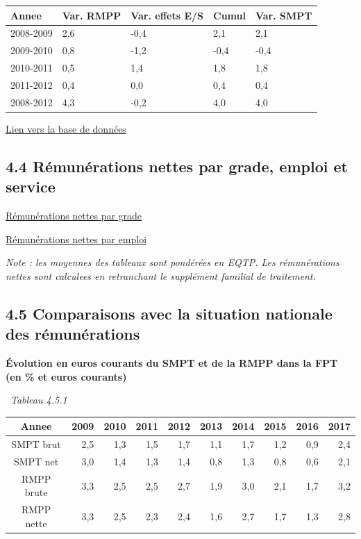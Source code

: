 \begin{longtable}[]{@{}lllll@{}}
\toprule
Annee & Var. RMPP & Var. effets E/S & Cumul & Var. SMPT\tabularnewline
\midrule
\endhead
2008-2009 & 2,6 & -0,4 & 2,1 & 2,1\tabularnewline
2009-2010 & 0,8 & -1,2 & -0,4 & -0,4\tabularnewline
2010-2011 & 0,5 & 1,4 & 1,8 & 1,8\tabularnewline
2011-2012 & 0,4 & 0,0 & 0,4 & 0,4\tabularnewline
2008-2012 & 4,3 & -0,2 & 4,0 & 4,0\tabularnewline
\bottomrule
\end{longtable}

\href{../Bases/Remunerations/Anavar.synthese.csv}{Lien vers la base de
données}

\hypertarget{remunerations-nettes-par-grade-emploi-et-service}{%
\subsection{4.4 Rémunérations nettes par grade, emploi et
service}\label{remunerations-nettes-par-grade-emploi-et-service}}

\href{../Bases/Remunerations/net.grades.csv}{Rémunérations nettes par
grade}

\href{../Bases/Remunerations/net.emplois.csv}{Rémunérations nettes par
emploi}

\emph{Note : les moyennes des tableaux sont pondérées en EQTP. Les
rémunérations nettes sont calculees en retranchant le supplément
familial de traitement.}

\hypertarget{comparaisons-avec-la-situation-nationale-des-remunerations}{%
\subsection{4.5 Comparaisons avec la situation nationale des
rémunérations}\label{comparaisons-avec-la-situation-nationale-des-remunerations}}

\textbf{Évolution en euros courants du SMPT et de la RMPP dans la FPT
(en \% et euros courants)}

~\emph{Tableau 4.5.1}

\begin{longtable}[]{@{}crrrrrrrrr@{}}
\toprule
Annee & 2009 & 2010 & 2011 & 2012 & 2013 & 2014 & 2015 & 2016 &
2017\tabularnewline
\midrule
\endhead
SMPT brut & 2,5 & 1,3 & 1,5 & 1,7 & 1,1 & 1,7 & 1,2 & 0,9 &
2,4\tabularnewline
SMPT net & 3,0 & 1,4 & 1,3 & 1,4 & 0,8 & 1,3 & 0,8 & 0,6 &
2,1\tabularnewline
RMPP brute & 3,3 & 2,5 & 2,5 & 2,7 & 1,9 & 3,0 & 2,1 & 1,7 &
3,2\tabularnewline
RMPP nette & 3,3 & 2,5 & 2,3 & 2,4 & 1,6 & 2,7 & 1,7 & 1,3 &
2,8\tabularnewline
\bottomrule
\end{longtable}


